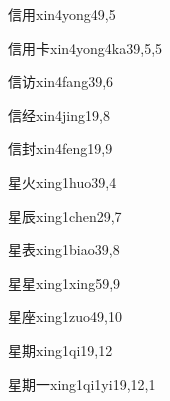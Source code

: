 \begin{verbete}{信用}{xin4yong4}{9,5}
\end{verbete}

\begin{verbete}{信用卡}{xin4yong4ka3}{9,5,5}
\end{verbete}

\begin{verbete}{信访}{xin4fang3}{9,6}
\end{verbete}

\begin{verbete}{信经}{xin4jing1}{9,8}
\end{verbete}

\begin{verbete}{信封}{xin4feng1}{9,9}
\end{verbete}

\begin{verbete}{星火}{xing1huo3}{9,4}
\end{verbete}

\begin{verbete}{星辰}{xing1chen2}{9,7}
\end{verbete}

\begin{verbete}{星表}{xing1biao3}{9,8}
\end{verbete}

\begin{verbete}{星星}{xing1xing5}{9,9}
\end{verbete}

\begin{verbete}{星座}{xing1zuo4}{9,10}
\end{verbete}

\begin{verbete}{星期}{xing1qi1}{9,12}
\end{verbete}

\begin{verbete}{星期一}{xing1qi1yi1}{9,12,1}
\end{verbete}


